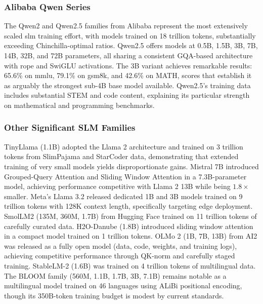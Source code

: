 \subsubsection{Alibaba Qwen Series}
\label{subsubsec:qwen_series}
The Qwen2 \citep{yang2024qwen2} and Qwen2.5 \citep{qwen2024qwen25} families from Alibaba represent the most extensively scaled \gls{slm} training effort, with models trained on 18 trillion tokens, substantially exceeding Chinchilla-optimal ratios. Qwen2.5 offers models at 0.5B, 1.5B, 3B, 7B, 14B, 32B, and 72B parameters, all sharing a consistent GQA-based architecture with \gls{rope} and SwiGLU activations. The 3B variant achieves remarkable results: 65.6\% on \gls{mmlu}, 79.1\% on \gls{gsm8k}, and 42.6\% on MATH, scores that establish it as arguably the strongest sub-4B base model available. Qwen2.5's training data includes substantial STEM and code content, explaining its particular strength on mathematical and programming benchmarks.

\subsubsection{Other Significant SLM Families}
\label{subsubsec:other_slm_families}
TinyLlama (1.1B) \citep{zhang2024tinyllama} adopted the Llama 2 architecture and trained on 3 trillion tokens from SlimPajama and StarCoder data, demonstrating that extended training of very small models yields disproportionate gains. Mistral 7B \citep{jiang2023mistral} introduced Grouped-Query Attention and Sliding Window Attention in a 7.3B-parameter model, achieving performance competitive with Llama 2 13B while being $1.8\times$ smaller. Meta's Llama 3.2 \citep{grattafiori2024llama3} released dedicated 1B and 3B models trained on 9 trillion tokens with 128K context length, specifically targeting edge deployment. SmolLM2 (135M, 360M, 1.7B) \citep{allal2025smollm2} from Hugging Face trained on 11 trillion tokens of carefully curated data. H2O-Danube (1.8B) \citep{singer2024h2odanube} introduced sliding window attention in a compact model trained on 1 trillion tokens. OLMo 2 (1B, 7B, 13B) \citep{olmo2025} from AI2 was released as a fully open model (data, code, weights, and training logs), achieving competitive performance through QK-norm and carefully staged training. StableLM-2 (1.6B) \citep{stabilityai2024stablelm} was trained on 4 trillion tokens of multilingual data. The BLOOM family (560M, 1.1B, 1.7B, 3B, 7.1B) \citep{bloom2022} remains notable as a multilingual model trained on 46 languages using ALiBi positional encoding, though its 350B-token training budget is modest by current standards.


